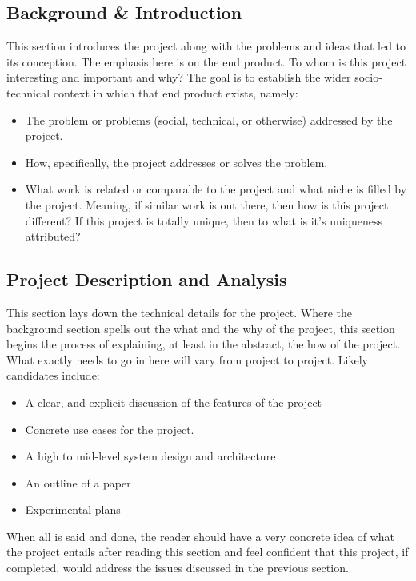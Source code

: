\documentclass[10pt]{article}
\begin{document}
\subsection{Background \& Introduction}

This section introduces the project along with the problems and ideas that led to its conception.  The emphasis here is on the end product.  To whom is this project interesting and important and why? The goal is to establish the wider socio-technical context in which that end product exists, namely:
\begin{itemize}
\item The problem or problems (social, technical, or otherwise) addressed by the project.
\item How, specifically, the project addresses or solves the problem.
\item What work is related or comparable to the project and what niche is filled by the project. Meaning, if similar work is out there, then how is this project different?  If this project is totally unique, then to what is it's uniqueness attributed?
\end{itemize}


\subsection{Project Description and Analysis}


This section lays down the technical details for the project. Where the background section spells out the what and the why of the project, this section begins the process of explaining, at least in the abstract, the how of the project. What exactly needs to go in here will vary from project to project.  Likely candidates include:
\begin{itemize}
\item A clear, and explicit discussion of the features of the project
\item Concrete use cases for the project.
\item A high to mid-level system design and architecture
\item An outline of a paper
\item Experimental plans
\end{itemize}
When all is said and done, the reader should have a very concrete idea of what the project entails after reading this section and feel confident that this project, if completed, would address the issues discussed in the previous section.
\end{document}
